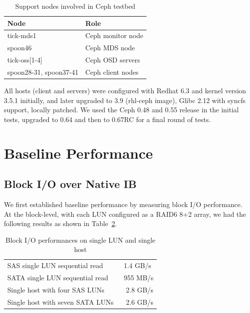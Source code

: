 \documentclass{article}
\begin{document}
\begin{table}[H]
\centering
    \begin{tabular}{ll}
    \toprule
    Node & Role \\
    \midrule
    tick-mds1 & Ceph monitor node \\
    spoon46 & Ceph MDS node \\
    tick-oss[1-4] & Ceph OSD servers \\
    spoon28-31, spoon37-41 & Ceph client nodes \\
    \bottomrule

    \end{tabular}
\caption{Support nodes involved in Ceph testbed}
\label{tbl:ceph-test-nodes}
\end{table}

All hosts  (client and servers) were configured with Redhat 6.3 and kernel
version 3.5.1 initially, and later upgraded to 3.9 (rhl-ceph image), Glibc
2.12 with syncfs support, locally patched.  We used the Ceph 0.48 and 0.55
release in the initial tests, upgraded to 0.64 and then to 0.67RC for a final
round of tests.



\section{Baseline Performance}
\label{sec:block-io}

\subsection{Block I/O over Native IB} 

We first established baseline performance by measuring block I/O performance.
At the block-level, with each LUN configured as a RAID6 8+2 array, we had the
following results as shown in Table~\ref{tbl:block-io-baseline}.

\begin{table}[htb]
\centering
\begin{tabular}{ll}
    \toprule
    SAS single LUN sequential read & ~1.4 GB/s \\
    SATA single LUN sequential read & ~955 MB/s \\[0.5em]
    Single host with four SAS LUNs & ~ 2.8 GB/s \\
    Single host with seven SATA LUNs & ~ 2.6 GB/s \\
    \bottomrule
\end{tabular}
\caption{Block I/O performances on single LUN and single host}
\label{tbl:block-io-baseline}
\end{table}
\end{document}
